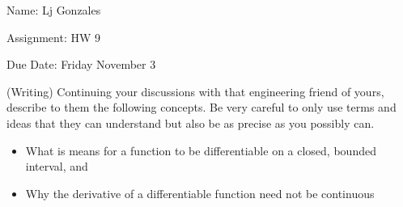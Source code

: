 \documentclass[11 pt]{article}
\begin{document}
    Name: Lj Gonzales

    Assignment: HW 9

    Due Date: Friday November 3
    \break
\begin{problem}
	(Writing) Continuing your discussions with that engineering friend of yours, describe to them the following concepts. Be very careful to only use terms and ideas that they can understand but also be as precise as you possibly can.
	\begin{itemize}
		\item What is means for a function to be differentiable on a closed, bounded interval, and
		\item Why the derivative of a differentiable function need not be continuous
	\end{itemize}
\end{problem}
\end{document}
